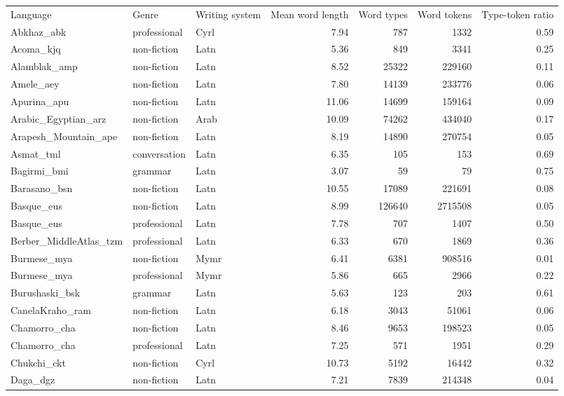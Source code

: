 \begin{longtable}{lllrrrr}
  \hline
Language & Genre & Writing system & Mean word length & Word types & Word tokens & Type-token ratio \\ 
 Abkhaz\_abk & professional & Cyrl & 7.94 & 787 & 1332 & 0.59 \\ 
  Acoma\_kjq & non-fiction & Latn & 5.36 & 849 & 3341 & 0.25 \\ 
  Alamblak\_amp & non-fiction & Latn & 8.52 & 25322 & 229160 & 0.11 \\ 
  Amele\_aey & non-fiction & Latn & 7.80 & 14139 & 233776 & 0.06 \\ 
  Apurina\_apu & non-fiction & Latn & 11.06 & 14699 & 159164 & 0.09 \\ 
  Arabic\_Egyptian\_arz & non-fiction & Arab & 10.09 & 74262 & 434040 & 0.17 \\ 
  Arapesh\_Mountain\_ape & non-fiction & Latn & 8.19 & 14890 & 270754 & 0.05 \\ 
  Asmat\_tml & conversation & Latn & 6.35 & 105 & 153 & 0.69 \\ 
  Bagirmi\_bmi & grammar & Latn & 3.07 & 59 & 79 & 0.75 \\ 
  Barasano\_bsn & non-fiction & Latn & 10.55 & 17089 & 221691 & 0.08 \\ 
  Basque\_eus & non-fiction & Latn & 8.99 & 126640 & 2715508 & 0.05 \\ 
  Basque\_eus & professional & Latn & 7.78 & 707 & 1407 & 0.50 \\ 
  Berber\_MiddleAtlas\_tzm & professional & Latn & 6.33 & 670 & 1869 & 0.36 \\ 
  Burmese\_mya & non-fiction & Mymr & 6.41 & 6381 & 908516 & 0.01 \\ 
  Burmese\_mya & professional & Mymr & 5.86 & 665 & 2966 & 0.22 \\ 
  Burushaski\_bsk & grammar & Latn & 5.63 & 123 & 203 & 0.61 \\ 
  CanelaKraho\_ram & non-fiction & Latn & 6.18 & 3043 & 51061 & 0.06 \\ 
  Chamorro\_cha & non-fiction & Latn & 8.46 & 9653 & 198523 & 0.05 \\ 
  Chamorro\_cha & professional & Latn & 7.25 & 571 & 1951 & 0.29 \\ 
  Chukchi\_ckt & non-fiction & Cyrl & 10.73 & 5192 & 16442 & 0.32 \\ 
  Daga\_dgz & non-fiction & Latn & 7.21 & 7839 & 214348 & 0.04 \\ 

\end{longtable}
